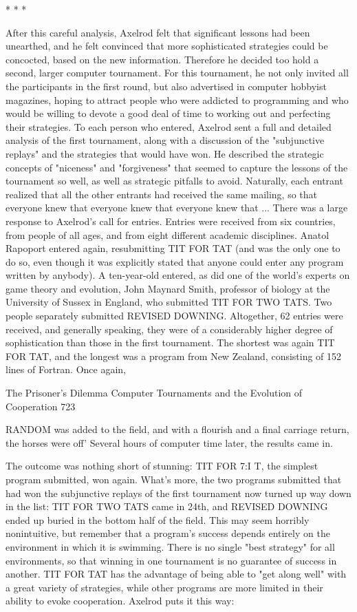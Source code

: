                                             *   *   *

        After this careful analysis, Axelrod felt that significant lessons had been
unearthed, and he felt convinced that more sophisticated strategies could be concocted,
based on the new information. Therefore he decided too hold a second, larger computer
tournament. For this tournament, he not only invited all the participants in the first round,
but also advertised in computer hobbyist magazines, hoping to attract people who were
addicted to programming and who would be willing to devote a good deal of time to
working out and perfecting their strategies. To each person who entered, Axelrod sent a
full and detailed analysis of the first tournament, along with a discussion of the
"subjunctive replays" and the strategies that would have won. He described the strategic
concepts of "niceness" and "forgiveness" that seemed to capture the lessons of the
tournament so well, as well as strategic pitfalls to avoid. Naturally, each entrant realized
that all the other entrants had received the same mailing, so that everyone knew that
everyone knew that everyone knew that ...
        There was a large response to Axelrod's call for entries. Entries were received
from six countries, from people of all ages, and from eight different academic disciplines.
Anatol Rapoport entered again, resubmitting TIT FOR TAT (and was the only one to do
so, even though it was explicitly stated that anyone could enter any program written by
anybody). A ten-year-old entered, as did one of the world's experts on game theory and
evolution, John Maynard Smith, professor of biology at the University of Sussex in
England, who submitted TIT FOR TWO TATS. Two people separately submitted
REVISED DOWNING.
        Altogether, 62 entries were received, and generally speaking, they were of a
considerably higher degree of sophistication than those in the first tournament. The
shortest was again TIT FOR TAT, and the longest was a program from New Zealand,
consisting of 152 lines of Fortran. Once again,




The Prisoner's Dilemma Computer Tournaments and the Evolution of Cooperation                  723

RANDOM was added to the field, and with a flourish and a final carriage return, the
horses were off' Several hours of computer time later, the results came in.


        The outcome was nothing short of stunning: TIT FOR 7:I T, the simplest program
submitted, won again. What's more, the two programs submitted that had won the
subjunctive replays of the first tournament now turned up way down in the list: TIT FOR
TWO TATS came in 24th, and REVISED DOWNING ended up buried in the bottom
half of the field.
        This may seem horribly nonintuitive, but remember that a program's success
depends entirely on the environment in which it is swimming. There is no single "best
strategy" for all environments, so that winning in one tournament is no guarantee of
success in another. TIT FOR TAT has the advantage of being able to "get along well"
with a great variety of strategies, while other programs are more limited in their ability to
evoke cooperation. Axelrod puts it this way:

